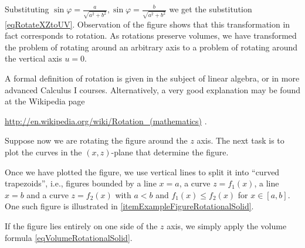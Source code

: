 \documentclass[12pt]{book}
\begin{document}
Substituting $\sin \varphi = \frac{a}{\sqrt{a^2+b^2}}, \sin \varphi = \frac{b}{\sqrt{a^2+b^2}}$ we get the substitution \eqref{eqRotateXZtoUV}. Observation of the figure shows that this transformation in fact corresponds to rotation. As rotations preserve volumes, we have transformed the problem of rotating around an arbitrary axis to a problem of rotating around the vertical axis $u=0$.

A formal definition of rotation is given in the subject of linear algebra, or in more advanced Calculus I courses. Alternatively, a very good explanation may be found at the Wikipedia page

\url{http://en.wikipedia.org/wiki/Rotation_(mathematics)} .

Suppose now we are rotating the figure around the $z$ axis. The next task is to plot the curves in the $(x,z)$-plane that determine the figure.

Once we have plotted the figure, we use vertical lines to split it into ``curved trapezoids'', i.e.,  figures bounded by a line $x=a$, a curve $z=f_1(x)$, a line $x=b$ and a curve $z=f_2(x)$ with $a< b$ and $f_1(x)\leq f_2(x)$ for $x\in [a,b]$. One such figure is illustrated in \ref{itemExampleFigureRotationalSolid}.

If the figure lies entirely on one side of the $z$ axis, we simply apply the volume formula  \eqref{eqVolumeRotationalSolid}.
\end{document}
